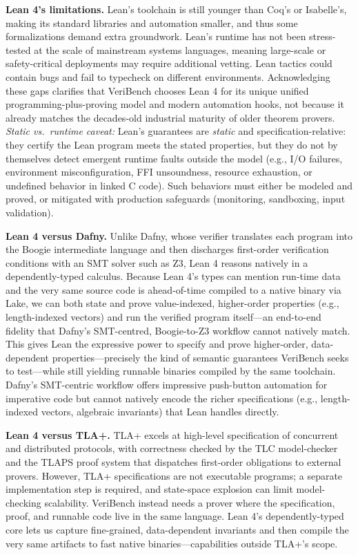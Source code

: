 \documentclass{article}
\begin{document}
\textbf{Lean 4's limitations.}
Lean's toolchain is still younger than Coq's or Isabelle's, making its standard libraries and automation smaller, and thus some formalizations demand extra groundwork. Lean's runtime has not been stress-tested at the scale of mainstream systems languages, meaning large-scale or safety-critical deployments may require additional vetting. Lean tactics could contain bugs and fail to typecheck on different environments.
Acknowledging these gaps clarifies that VeriBench chooses Lean 4 for its unique unified programming-plus-proving model and modern automation hooks, not because it already matches the decades-old industrial maturity of older theorem provers.
\noindent\textit{Static vs.\ runtime caveat:}
Lean's guarantees are \emph{static} and specification-relative: they certify the Lean program meets the stated properties, but they do not by themselves detect emergent runtime faults outside the model (e.g., I/O failures, environment misconfiguration, FFI unsoundness, resource exhaustion, or undefined behavior in linked C code).
Such behaviors must either be modeled and proved, or mitigated with production safeguards (monitoring, sandboxing, input validation).

\textbf{Lean 4 versus Dafny.}
Unlike Dafny, whose verifier translates each program into the Boogie intermediate language and then discharges first-order verification conditions with an SMT solver such as Z3, Lean 4 reasons natively in a dependently-typed calculus.
Because Lean 4's types can mention run-time data and the very same source code is ahead-of-time compiled to a native binary via Lake, we can both state and prove value-indexed, higher-order properties (e.g., length-indexed vectors) and run the verified program itself---an end-to-end fidelity that Dafny's SMT-centred, Boogie-to-Z3 workflow cannot natively match.
This gives Lean the expressive power to specify and prove higher-order, data-dependent properties---precisely the kind of semantic guarantees VeriBench seeks to test---while still yielding runnable binaries compiled by the same toolchain.
Dafny's SMT-centric workflow offers impressive push-button automation for imperative code but cannot natively encode the richer specifications (e.g., length-indexed vectors, algebraic invariants) that Lean handles directly.

\textbf{Lean 4 versus TLA+.}
TLA+ excels at high-level specification of concurrent and distributed protocols, with correctness checked by the TLC model-checker and the TLAPS proof system that dispatches first-order obligations to external provers.
However, TLA+ specifications are not executable programs; a separate implementation step is required, and state-space explosion can limit model-checking scalability.
VeriBench instead needs a prover where the specification, proof, and runnable code live in the same language.
Lean 4's dependently-typed core lets us capture fine-grained, data-dependent invariants and then compile the very same artifacts to fast native binaries---capabilities outside TLA+'s scope.
\end{document}
